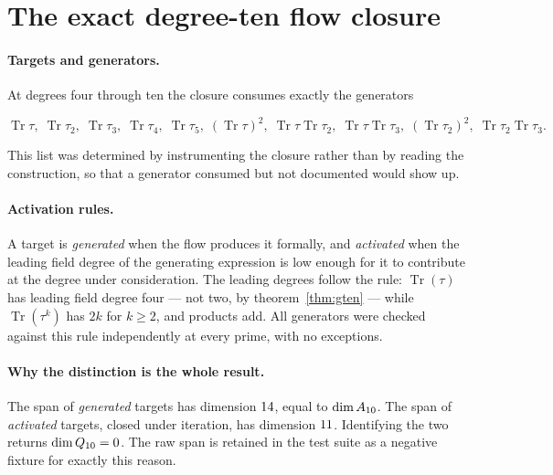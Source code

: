 \section{The exact degree-ten flow closure}
\label{app:closure}

\paragraph{Targets and generators.}
At degrees four through ten the closure consumes exactly the generators
\begin{widetext}
\begin{equation}
\operatorname{Tr}\tau,\;
\operatorname{Tr}\tau_2,\;
\operatorname{Tr}\tau_3,\;
\operatorname{Tr}\tau_4,\;
\operatorname{Tr}\tau_5,\;
(\operatorname{Tr}\tau)^2,\;
\operatorname{Tr}\tau\operatorname{Tr}\tau_2,\;
\operatorname{Tr}\tau\operatorname{Tr}\tau_3,\;
(\operatorname{Tr}\tau_2)^2,\;
\operatorname{Tr}\tau_2\operatorname{Tr}\tau_3 .
\end{equation}
\end{widetext}
This list was determined by instrumenting the closure rather than by reading the
construction, so that a generator consumed but not documented would show up.

\paragraph{Activation rules.}
A target is \emph{generated} when the flow produces it formally, and
\emph{activated} when the leading field degree of the generating expression is
low enough for it to contribute at the degree under consideration. The leading
degrees follow the rule: $\operatorname{Tr}(\tau)$ has leading field degree four
--- not two, by theorem~\ref{thm:gten} --- while $\operatorname{Tr}(\tau^k)$ has
$2k$ for $k \ge 2$, and products add. All generators were checked against this
rule independently at every prime, with no exceptions.

\paragraph{Why the distinction is the whole result.}
The span of \emph{generated} targets has dimension $14$, equal to
$\dim A_{10}$. The span of \emph{activated} targets, closed under iteration, has
dimension $11$. Identifying the two returns $\dim Q_{10} = 0$. The raw span
is retained in the test suite as a negative fixture for exactly this reason.

